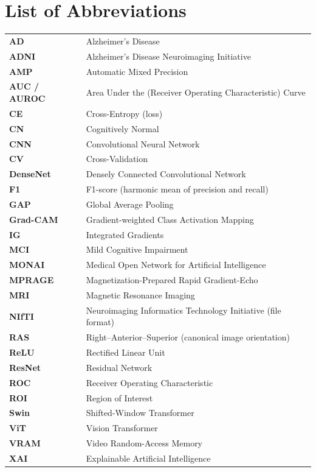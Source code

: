 \chapter*{List of Abbreviations}
\renewcommand{\arraystretch}{1.3}
\begin{longtable}{p{3cm}p{11cm}}
\textbf{AD} & Alzheimer's Disease \\
\textbf{ADNI} & Alzheimer's Disease Neuroimaging Initiative \\
\textbf{AMP} & Automatic Mixed Precision \\
\textbf{AUC / AUROC} & Area Under the (Receiver Operating Characteristic) Curve \\
\textbf{CE} & Cross-Entropy (loss) \\
\textbf{CN} & Cognitively Normal \\
\textbf{CNN} & Convolutional Neural Network \\
\textbf{CV} & Cross-Validation \\
\textbf{DenseNet} & Densely Connected Convolutional Network \\
\textbf{F1} & F1-score (harmonic mean of precision and recall) \\
\textbf{GAP} & Global Average Pooling \\
\textbf{Grad-CAM} & Gradient-weighted Class Activation Mapping \\
\textbf{IG} & Integrated Gradients \\
\textbf{MCI} & Mild Cognitive Impairment \\
\textbf{MONAI} & Medical Open Network for Artificial Intelligence \\
\textbf{MPRAGE} & Magnetization-Prepared Rapid Gradient-Echo \\
\textbf{MRI} & Magnetic Resonance Imaging \\
\textbf{NIfTI} & Neuroimaging Informatics Technology Initiative (file format) \\
\textbf{RAS} & Right--Anterior--Superior (canonical image orientation) \\
\textbf{ReLU} & Rectified Linear Unit \\
\textbf{ResNet} & Residual Network \\
\textbf{ROC} & Receiver Operating Characteristic \\
\textbf{ROI} & Region of Interest \\
\textbf{Swin} & Shifted-Window Transformer \\
\textbf{ViT} & Vision Transformer \\
\textbf{VRAM} & Video Random-Access Memory \\
\textbf{XAI} & Explainable Artificial Intelligence \\
\end{longtable}
